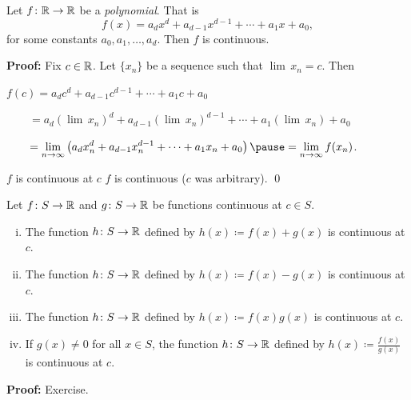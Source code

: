 \documentclass[10pt,aspectratio=149]{beamer}
\begin{document}
\begin{frame}

\begin{proposition}
Let $f \colon {\mathbb{R}} \to {\mathbb{R}}$ be a \emph{polynomial}.  That is
\begin{equation*}
f(x) = a_d x^d + a_{d-1} x^{d-1} + \cdots + a_1 x + a_0 ,
\end{equation*}
for some constants $a_0, a_1, \ldots, a_d$.
Then $f$ is continuous.
\end{proposition}

\pause
\textbf{Proof:}
Fix $c \in {\mathbb{R}}$.  
\pause
Let $\{ x_n \}$ be a sequence such that
$\lim\, x_n = c$.
\pause
Then

\medskip

$\displaystyle
f(c) =
a_d c^d + a_{d-1} c^{d-1} + \cdots + a_1 c + a_0 
$

\pause
\medskip

$\displaystyle
\qquad = 
a_d {(\lim\, x_n)}^d + a_{d-1} {(\lim\, x_n)}^{d-1} + \cdots + a_1 (\lim\, x_n) + a_0 
$

\pause
\medskip

$\displaystyle
\qquad = 
\lim_{n \to \infty}
\left(
a_d x_n^d + a_{d-1} x_n^{d-1} + \cdots + a_1 x_n + a_0 
\right)
\pause
=
\lim_{n \to \infty}
f(x_n)$.

\pause
\medskip

\thus \quad $f$ is continuous at $c$
\pause
\wthus
$f$ is continuous ($c$ was arbitrary).
\qed

\end{frame}

\begin{frame}

\begin{proposition}
Let $f \colon S \to {\mathbb{R}}$ and $g \colon S \to {\mathbb{R}}$ be functions
continuous at $c \in S$.
\begin{enumerate}[(i)]
\item
\pause
The function $h \colon S \to {\mathbb{R}}$ defined by
$h(x) \coloneqq f(x)+g(x)$ is continuous at $c$.
\item
\pause
The function $h \colon S \to {\mathbb{R}}$ defined by
$h(x) \coloneqq f(x)-g(x)$ is continuous at $c$.
\item
\pause
The function $h \colon S \to {\mathbb{R}}$ defined by
$h(x) \coloneqq f(x)g(x)$ is continuous at $c$.
\item
\pause
If $g(x)\not=0$ for all $x \in S$, the function $h \colon S \to {\mathbb{R}}$
defined by $h(x) \coloneqq \frac{f(x)}{g(x)}$ is continuous at $c$.
\end{enumerate}
\end{proposition}

\pause
\textbf{Proof:} Exercise.

\end{frame}
\end{document}
